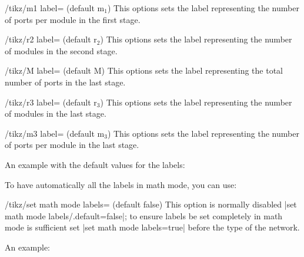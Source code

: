 \documentclass{ltxdoc}
\begin{document}
\begin{key}{/tikz/m1 label= (default m$_1$)}
    This options sets the label representing the number of ports per module in the first stage.
\end{key}

\begin{key}{/tikz/r2 label= (default r$_2$)}
    This options sets the label representing the number of modules in the second stage.
\end{key}

\begin{key}{/tikz/M label= (default M)}
    This options sets the label representing the total number of ports in the last stage.
\end{key}

\begin{key}{/tikz/r3 label= (default r$_3$)}
    This options sets the label representing the number of modules in the last stage.
\end{key}

\begin{key}{/tikz/m3 label= (default m$_3$)}
    This options sets the label representing the number of ports per module in the last stage.
\end{key}

An example with the default values for the labels:

\begin{codeexample}[]
\end{codeexample}

To have automatically all the labels in math mode, you can use:
\begin{key}{/tikz/set math mode labels= (default false)}
	This option is normally disabled |set math mode labels/.default=false|; to ensure labels be set completely in math mode is sufficient set |set math mode labels=true| before the type of the network.
\end{key}

An example:
\begin{codeexample}[]
\end{codeexample}
\end{document}

